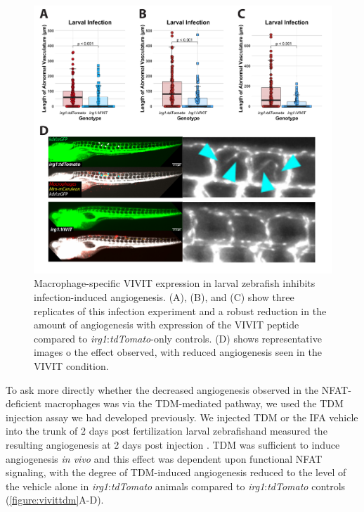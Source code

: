 \begin{figure}
\centering
\includegraphics[width=\textwidth]{images/vivitlinf.pdf}
\caption{Macrophage-specific VIVIT expression in larval zebrafish inhibits infection-induced angiogenesis. (A), (B), and (C) show three replicates of this infection experiment and a robust reduction in the amount of angiogenesis with expression of the VIVIT peptide compared to \textit{irg1}:\textit{tdTomato}-only controls. (D) shows representative images o the effect observed, with reduced angiogenesis seen in the VIVIT condition.}
\label{figure:vivitinf}
\end{figure}

To ask more directly whether the decreased angiogenesis observed in the NFAT-deficient macrophages was via the TDM-mediated pathway, we used the TDM injection assay we had developed previously. We injected TDM or the IFA vehicle into the trunk of 2 days post fertilization larval zebrafishand measured the resulting angiogenesis at 2 days post injection \citep{Walton2018}. TDM was sufficient to induce angiogenesis \textit{in vivo} and this effect was dependent upon functional NFAT signaling, with the degree of TDM-induced angiogenesis reduced to the level of the vehicle alone in \textit{irg1}:\textit{tdTomato} animals compared to \textit{irg1}:\textit{tdTomato} controls (\autoref{figure:vivittdm}A-D).

